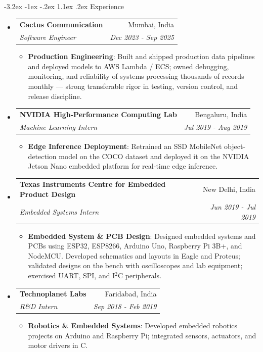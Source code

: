 \documentclass[letterpaper,11pt]{article}
\makeatletter
\renewcommand\section{\@startsection{section}{1}{\z@}%
  {-3.2ex \@plus -1ex \@minus -.2ex}%
  {1.1ex \@plus .2ex}%
  {\normalfont\large\bfseries}}
\newcommand{\resumeItem}[2]{\item\small{\textbf{#1}{: #2 \vspace{-2pt}}}}
\newcommand{\resumeSubheading}[4]{%
  \vspace{-1pt}\item
    \begin{tabular*}{0.97\textwidth}[t]{l@{\extracolsep{\fill}}r}
      \textbf{#1} & #2 \\
      \textit{\small#3} & \textit{\small #4} \\
    \end{tabular*}\vspace{-5pt}}
\newcommand{\resumeSubHeadingListStart}{\begin{itemize}}
\newcommand{\resumeSubHeadingListEnd}{\end{itemize}}
\newcommand{\resumeItemListStart}{\begin{itemize}}
\newcommand{\resumeItemListEnd}{\end{itemize}\vspace{-5pt}}
\makeatother
\begin{document}
\section{Experience}
\resumeSubHeadingListStart
\resumeSubheading
{Cactus Communication}{Mumbai, India}
{Software Engineer}{Dec 2023 - Sep 2025}
\resumeItemListStart
\resumeItem{Production Engineering}
{Built and shipped production data pipelines and deployed models to AWS Lambda / ECS; owned debugging, monitoring, and reliability of systems processing thousands of records monthly --- strong transferable rigor in testing, version control, and release discipline.}
\resumeItemListEnd

\resumeSubheading
{NVIDIA High-Performance Computing Lab}{Bengaluru, India}
{Machine Learning Intern}{Jul 2019 - Aug 2019}
\resumeItemListStart
\resumeItem{Edge Inference Deployment}
{Retrained an SSD MobileNet object-detection model on the COCO dataset and deployed it on the NVIDIA Jetson Nano embedded platform for real-time edge inference.}
\resumeItemListEnd

\resumeSubheading
{Texas Instruments Centre for Embedded Product Design}{New Delhi, India}
{Embedded Systems Intern}{Jun 2019 - Jul 2019}
\resumeItemListStart
\resumeItem{Embedded System \& PCB Design}
{Designed embedded systems and PCBs using ESP32, ESP8266, Arduino Uno, Raspberry Pi 3B+, and NodeMCU. Developed schematics and layouts in Eagle and Proteus; validated designs on the bench with oscilloscopes and lab equipment; exercised UART, SPI, and I$^2$C peripherals.}
\resumeItemListEnd

\resumeSubheading
{Technoplanet Labs}{Faridabad, India}
{R\&D Intern}{Sep 2018 - Feb 2019}
\resumeItemListStart
\resumeItem{Robotics \& Embedded Systems}
{Developed embedded robotics projects on Arduino and Raspberry Pi; integrated sensors, actuators, and motor drivers in C.}
\resumeItemListEnd
\resumeSubHeadingListEnd

\end{document}
